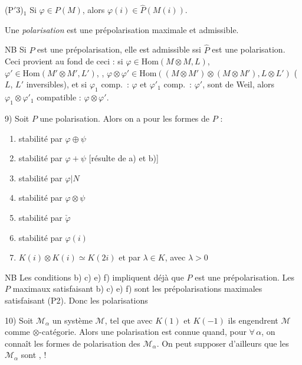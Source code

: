 \documentclass[11pt,a4paper]{article}
\begin{document}
(P$'$3)$_1$ Si $\varphi \in P(M)$, alors $\varphi(i) \in \widehat{P}(M(i))$.

Une \emph{polarisation} est une prépolarisation maximale et admissible.

NB Si $P$ est une prépolarisation, elle est admissible ssi $\widehat{P}$ est
une polarisation. Ceci provient au fond de ceci : si
$\varphi \in \mathrm{Hom}(M \otimes M, L)$,
$\varphi' \in \mathrm{Hom}(M' \otimes M', L')$, ,
$\varphi \otimes \varphi' \in \mathrm{Hom}((M \otimes M') \otimes (M \otimes M'),
L \otimes L')$ ($L$, $L'$ inversibles), et si $\varphi_1$ comp.\ :
$\varphi$ et $\varphi'_1$ comp.\ : $\varphi'$, sont de Weil, alors
$\varphi_1 \otimes \varphi'_1$ compatible : $\varphi \otimes \varphi'$.

9) Soit $P$ une polarisation. Alors on a pour les formes de $P$ :
\begin{enumerate}
\item[a)] stabilité par $\varphi \oplus \psi$
\item[a$'$)] stabilité par $\varphi + \psi$ [résulte de a) et b)]
\item[b)] stabilité par $\varphi|N$
\item[c)] stabilité par $\varphi \otimes \psi$
\item[e)] stabilité par $\check{\varphi}$
\item[d)] stabilité par $\varphi(i)$
\item[f)]   $K(i) \otimes K(i) \simeq
K(2i)$ \struck{\ill{}} et  par $\lambda \in K$,
avec $\lambda > 0$
\end{enumerate}

NB Les conditions b) c) e) f) impliquent déjà que $P$ est une
prépolarisation. Les $P$ maximaux satisfaisant b) c) e) f) sont les
prépolarisations maximales satisfaisant (P2). Donc les polarisations
 \ill{}

10) Soit $\mathcal{M}_{\alpha}$ un système \struck{\ill{}}  $\mathcal{M}$, tel que avec $K(1)$ et $K(-1)$
ils engendrent $\mathcal{M}$ comme $\otimes$-catégorie. Alors une polarisation
est connue quand, pour $\forall\, \alpha$, on connaît les formes de
polarisation  des $\mathcal{M}_{\alpha}$. On peut
supposer d'ailleurs que les $\mathcal{M}_{\alpha}$ sont , \ill{}  ! \struck{\ill{}}
\end{document}
